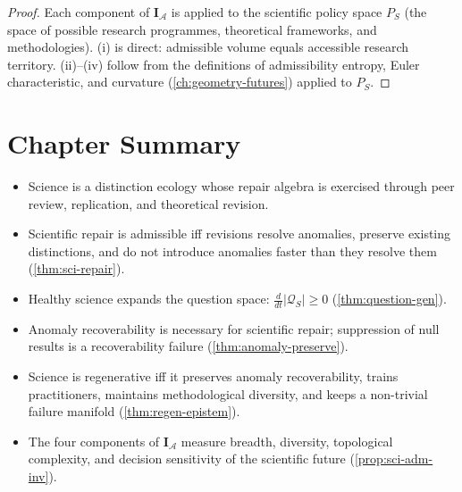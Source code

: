 \documentclass[12pt,twoside,openright]{book}
\newcommand{\adm}{\mathcal{A}}
\newenvironment{chapsummary}{%
  \begin{tcolorbox}[colback=DistBlue!5,colframe=DistBlue,
    title={\faBookOpen\enspace Summary},
    fonttitle=\sffamily\bfseries\color{white},
    attach boxed title to top left={yshift=-2mm,xshift=4mm},
    boxed title style={colback=DistBlue,rounded corners}]
  \begin{itemize}[nosep,leftmargin=*]}{%
  \end{itemize}\end{tcolorbox}}
\newcounter{exercise}[chapter]
\begin{document}
\begin{proof}
  Each component of $\mathbf{I}_\adm$ is applied to
  the scientific policy space $P_S$ (the space of
  possible research programmes, theoretical frameworks,
  and methodologies).
  (i) is direct: admissible volume equals accessible
  research territory.
  (ii)--(iv) follow from the definitions of
  admissibility entropy, Euler characteristic, and
  curvature (\cref{ch:geometry-futures}) applied to $P_S$.
\end{proof}

\section*{Chapter Summary}
\begin{chapsummary}
  \item Science is a distinction ecology whose repair
        algebra is exercised through peer review,
        replication, and theoretical revision.
  \item Scientific repair is admissible iff revisions
        resolve anomalies, preserve existing distinctions,
        and do not introduce anomalies faster than they
        resolve them (\cref{thm:sci-repair}).
  \item Healthy science expands the question space:
        $\frac{d}{dt}|\mathcal{Q}_S| \ge 0$
        (\cref{thm:question-gen}).
  \item Anomaly recoverability is necessary for
        scientific repair; suppression of null results
        is a recoverability failure
        (\cref{thm:anomaly-preserve}).
  \item Science is regenerative iff it preserves
        anomaly recoverability, trains practitioners,
        maintains methodological diversity, and
        keeps a non-trivial failure manifold
        (\cref{thm:regen-epistem}).
  \item The four components of $\mathbf{I}_\adm$
        measure breadth, diversity, topological
        complexity, and decision sensitivity of the
        scientific future (\cref{prop:sci-adm-inv}).
\end{chapsummary}
\end{document}
